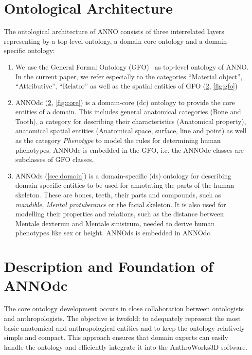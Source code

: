 \documentclass[sw]{iosart2x}
\newcommand{\aw}{AnthroWorks3D}
\begin{document}

\section{Ontological Architecture}\label{sec:architecture}

The ontological architecture of ANNO consists of three interrelated layers representing by a top-level ontology, a domain-core ontology and a domain-specific ontology:

\begin{enumerate}
\item We use the General Formal Ontology (GFO)~\citep{gfo} as top-level ontology of ANNO.
In the current paper, we refer especially to the categories \enquote{Material object}, \enquote{Attributive}, \enquote{Relator} as well as the spatial entities of GFO (\cref{sec:core}, \cref{fig:gfo})

\item ANNOdc (\cref{sec:core}, \cref{fig:core}) is a domain-core (dc) ontology to provide the core entities of a domain.
This includes general anatomical categories (Bone and Tooth), a category for describing their characteristics (Anatomical property), anatomical spatial entities (Anatomical space, surface, line and point) as well as the category \emph{Phenotype} to model the rules for determining human phenotypes.
ANNOdc is embedded in the GFO, i.e. the ANNOdc classes are subclasses of GFO classes.

\item ANNOds (\cref{sec:domain}) is a domain-specific (ds) ontology for describing domain-specific entities to be used for annotating the parts of the human skeleton.
These are bones, teeth, their parts and compounds, such as \emph{mandible}, \emph{Mental protuberance} or the facial skeleton.
It is also used for modelling their properties and relations, such as the distance between Mentale dexterum and Mentale sinistrum, needed to derive human phenotypes like sex or height.
ANNOds is embedded in ANNOdc.
\end{enumerate}


\section{Description and Foundation of ANNOdc}\label{sec:core}
The core ontology development occurs in close collaboration between ontologists and anthropologists.
The objective is twofold: to adequately represent the most basic anatomical and anthropological entities and to keep the ontology relatively simple and compact.
This approach ensures that domain experts can easily handle the ontology and efficiently integrate it into the \aw{} software.
\end{document}
